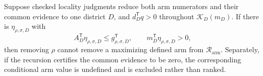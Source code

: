 Suppose checked locality judgments reduce both arm numerators and their common evidence to one district \(D\), and \(d_D^{\mathsf T}q>0\) throughout \(\mathcal K_D(m_D)\).  If there is \(\eta_{\rho,\sigma,D}\) with
\[
A_D^{\mathsf T}\eta_{\rho,\sigma,D}\le g_{\rho,\sigma,D}^{\mathsf T},
\qquad m_D^{\mathsf T}\eta_{\rho,\sigma,D}>0,
\]
then removing \(\rho\) cannot remove a maximizing defined arm from \(\mathcal R_{\mathrm{arm}}\).  Separately, if the recursion certifies the common evidence to be zero, the corresponding conditional arm value is undefined and is excluded rather than ranked.